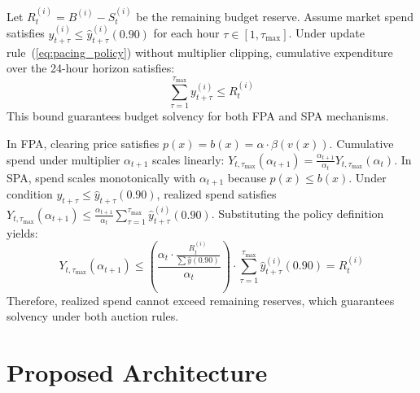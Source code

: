 \documentclass[sigconf]{acmart}
\begin{document}
\begin{lemma}
  Let $R_t^{(i)} = B^{(i)} - S_t^{(i)}$ be the remaining budget reserve. Assume market spend satisfies $y_{t+\tau}^{(i)} \le \hat{y}_{t+\tau}^{(i)}(0.90)$ for each hour $\tau \in [1, \tau_{\max}]$. Under update rule~(\ref{eq:pacing_policy}) without multiplier clipping, cumulative expenditure over the 24-hour horizon satisfies:
  \begin{equation}
    \sum_{\tau=1}^{\tau_{\max}} y_{t+\tau}^{(i)} \le R_t^{(i)}
  \end{equation}
  This bound guarantees budget solvency for both FPA and SPA mechanisms.
\end{lemma}

In FPA, clearing price satisfies $p(x) = b(x) = \alpha \cdot \beta(v(x))$. Cumulative spend under multiplier $\alpha_{t+1}$ scales linearly: $Y_{t, \tau_{\max}}(\alpha_{t+1}) = \frac{\alpha_{t+1}}{\alpha_t} Y_{t, \tau_{\max}}(\alpha_t)$. In SPA, spend scales monotonically with $\alpha_{t+1}$ because $p(x) \le b(x)$. Under condition $y_{t+\tau} \le \hat{y}_{t+\tau}(0.90)$, realized spend satisfies $Y_{t, \tau_{\max}}(\alpha_{t+1}) \le \frac{\alpha_{t+1}}{\alpha_t} \sum_{\tau=1}^{\tau_{\max}} \hat{y}_{t+\tau}^{(i)}(0.90)$. Substituting the policy definition yields:
\begin{equation}
  Y_{t, \tau_{\max}}(\alpha_{t+1}) \le \left(\frac{\alpha_t \cdot \frac{R_t^{(i)}}{\sum \hat{y}(0.90)}}{\alpha_t}\right) \cdot \sum_{\tau=1}^{\tau_{\max}} \hat{y}_{t+\tau}^{(i)}(0.90) = R_t^{(i)}
\end{equation}
Therefore, realized spend cannot exceed remaining reserves, which guarantees solvency under both auction rules.

\section{Proposed Architecture}
\end{document}
